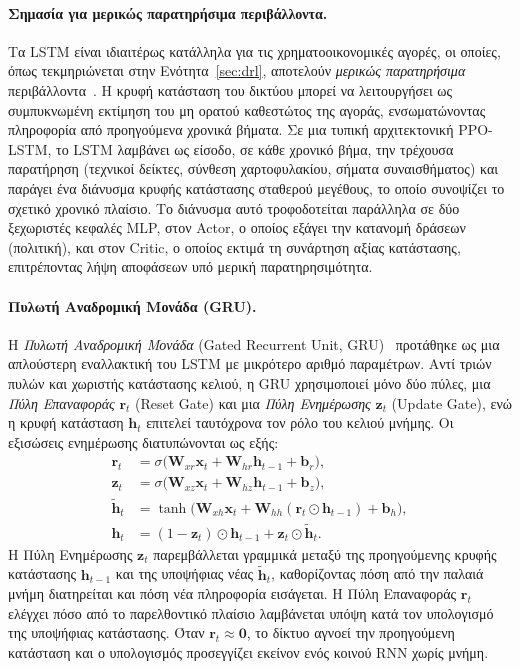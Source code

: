 \paragraph{Σημασία για μερικώς παρατηρήσιμα περιβάλλοντα.}
Τα LSTM είναι ιδιαιτέρως κατάλληλα για τις χρηματοοικονομικές αγορές, οι
οποίες, όπως τεκμηριώνεται στην Ενότητα~\ref{sec:drl}, αποτελούν \emph{μερικώς
παρατηρήσιμα} περιβάλλοντα~\cite{hambly2023rlfinance}. Η κρυφή κατάσταση του δικτύου μπορεί να
λειτουργήσει ως συμπυκνωμένη εκτίμηση του μη ορατού καθεστώτος της αγοράς,
ενσωματώνοντας πληροφορία από προηγούμενα χρονικά βήματα. Σε μια τυπική
αρχιτεκτονική PPO-LSTM, το LSTM λαμβάνει ως είσοδο, σε κάθε χρονικό βήμα, την
τρέχουσα παρατήρηση (τεχνικοί δείκτες, σύνθεση χαρτοφυλακίου, σήματα
συναισθήματος) και παράγει ένα διάνυσμα κρυφής κατάστασης σταθερού μεγέθους, το
οποίο συνοψίζει το σχετικό χρονικό πλαίσιο. Το διάνυσμα αυτό τροφοδοτείται
παράλληλα σε δύο ξεχωριστές κεφαλές MLP, στον Actor, ο οποίος εξάγει την
κατανομή δράσεων (πολιτική), και στον Critic, ο οποίος εκτιμά τη συνάρτηση
αξίας κατάστασης, επιτρέποντας λήψη αποφάσεων υπό μερική παρατηρησιμότητα.

\paragraph{Πυλωτή Αναδρομική Μονάδα (GRU).}
Η \emph{Πυλωτή Αναδρομική Μονάδα} (Gated Recurrent Unit,
GRU)~\cite{cho2014gru} προτάθηκε ως μια απλούστερη εναλλακτική του LSTM με
μικρότερο αριθμό παραμέτρων. Αντί τριών πυλών και χωριστής κατάστασης κελιού,
η GRU χρησιμοποιεί μόνο δύο πύλες, μια \emph{Πύλη Επαναφοράς}
$\mathbf{r}_t$ (Reset Gate) και μια \emph{Πύλη Ενημέρωσης}
$\mathbf{z}_t$ (Update Gate), ενώ η κρυφή κατάσταση $\mathbf{h}_t$
επιτελεί ταυτόχρονα τον ρόλο του κελιού μνήμης. Οι εξισώσεις ενημέρωσης
διατυπώνονται ως εξής:
\begin{align}
    \mathbf{r}_t &= \sigma\!\big(\mathbf{W}_{xr}\mathbf{x}_t
        + \mathbf{W}_{hr}\mathbf{h}_{t-1} + \mathbf{b}_r\big),
    \label{eq:gru-r}\\
    \mathbf{z}_t &= \sigma\!\big(\mathbf{W}_{xz}\mathbf{x}_t
        + \mathbf{W}_{hz}\mathbf{h}_{t-1} + \mathbf{b}_z\big),
    \label{eq:gru-z}\\
    \tilde{\mathbf{h}}_t &= \tanh\!\big(\mathbf{W}_{xh}\mathbf{x}_t
        + \mathbf{W}_{hh}(\mathbf{r}_t \odot \mathbf{h}_{t-1})
        + \mathbf{b}_h\big),
    \label{eq:gru-hcand}\\
    \mathbf{h}_t &= (1 - \mathbf{z}_t) \odot \mathbf{h}_{t-1}
        + \mathbf{z}_t \odot \tilde{\mathbf{h}}_t.
    \label{eq:gru-h}
\end{align}
Η Πύλη Ενημέρωσης $\mathbf{z}_t$ παρεμβάλλεται γραμμικά μεταξύ της
προηγούμενης κρυφής κατάστασης $\mathbf{h}_{t-1}$ και της υποψήφιας νέας
$\tilde{\mathbf{h}}_t$, καθορίζοντας πόση από την παλαιά μνήμη διατηρείται
και πόση νέα πληροφορία εισάγεται. Η Πύλη Επαναφοράς $\mathbf{r}_t$ ελέγχει
πόσο από το παρελθοντικό πλαίσιο λαμβάνεται υπόψη κατά τον υπολογισμό της
υποψήφιας κατάστασης. Όταν $\mathbf{r}_t \approx \mathbf{0}$, το δίκτυο
αγνοεί την προηγούμενη κατάσταση και ο υπολογισμός προσεγγίζει εκείνον ενός
κοινού RNN χωρίς μνήμη.

